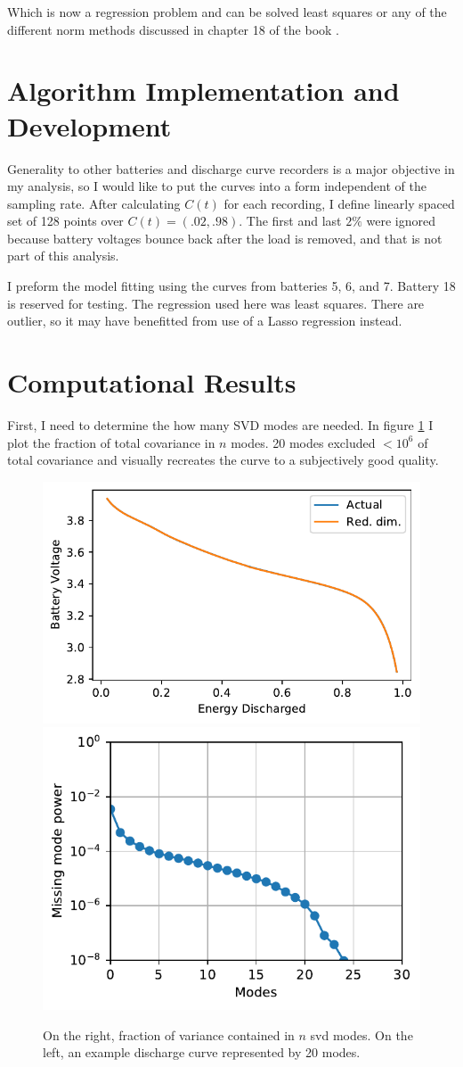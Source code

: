 \documentclass{article}
\begin{document}
    Which is now a regression problem and can be solved least squares or any
    of the different norm methods discussed in chapter 18 of the book
    \cite{Kutz2013}.

    \section{Algorithm Implementation and Development}
    Generality to other batteries and discharge curve recorders is a major
    objective in my analysis, so I would like to put the curves into a form
    independent of the sampling rate. After calculating $C(t)$ for each
    recording, I define linearly spaced set of 128 points over
    $C(t) = (.02, .98)$. The first and last $2 \%$ were ignored because battery
    voltages bounce back after the load is removed, and that is not part of this
    analysis.

    I preform the model fitting using the curves from batteries 5, 6, and 7.
    Battery 18 is reserved for testing. The regression used here was least
    squares. There are outlier, so it may have benefitted from use of a
    Lasso regression instead.

    \section{Computational Results}
    First, I need to determine the how many SVD modes are needed. In figure
    \ref{fig:mode_frac} I plot the fraction of total covariance in $n$ modes.
    20 modes excluded $< 10^6 $ of total covariance and visually recreates the
    curve to a subjectively good quality.
    \begin{figure}[tbp]
        \centering
        \includegraphics[width=.48\textwidth]{red_dim.pdf}
        \includegraphics[width=.48\textwidth]{mode_frac.pdf}
        \caption{\label{fig:mode_frac} On the right, fraction of variance
        contained in $n$ svd modes. On the left, an example discharge curve
        represented by 20 modes.}
    \end{figure}
\end{document}
